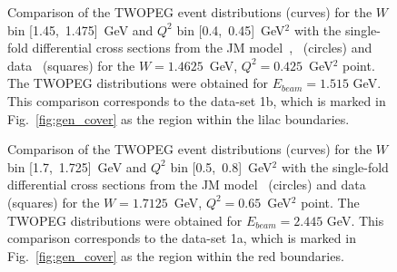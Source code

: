\begin{figure}[!ht]
\begin{center}
\end{center}
\vspace{-0.6cm}
\caption{\small Comparison of the TWOPEG event distributions (curves) for the $W$ bin [1.45,~1.475]~GeV and $Q^2$ bin [0.4,~0.45]~GeV$^2$ with the single-fold differential cross sections from the JM model~\cite{Mokeev:2008iw},~\cite{Mokeev:2012vsa} (circles) and data~\cite{Fedotov:2008aa} (squares) for the $W = 1.4625$~GeV, $Q^2 = 0.425$~GeV$^2$ point. The TWOPEG distributions were obtained for $E_{beam} = 1.515$ GeV. This comparison corresponds to the data-set 1b, which is marked in Fig.~\ref{fig:gen_cover} as the region within the lilac boundaries.}
\label{fig:eg_fed_0425_14625}
\end{figure}



\begin{figure}[!ht]
\begin{center}
\end{center}
\vspace{-0.6cm}
\caption{\small Comparison of the TWOPEG event distributions (curves) for the $W$ bin [1.7,~1.725]~GeV and $Q^2$ bin [0.5,~0.8]~GeV$^2$ with the single-fold differential cross sections from the JM model~\cite{Mokeev:2015lda} (circles) and data~\cite{Ripani:2002ss} (squares) for the $W = 1.7125$~GeV, $Q^2 = 0.65$~GeV$^2$ point. The TWOPEG distributions were obtained for $E_{beam} = 2.445$ GeV. This comparison corresponds to the data-set 1a, which is marked in Fig.~\ref{fig:gen_cover} as the region within the red boundaries.}
\label{fig:eg_rip_065_17125}
\end{figure}




